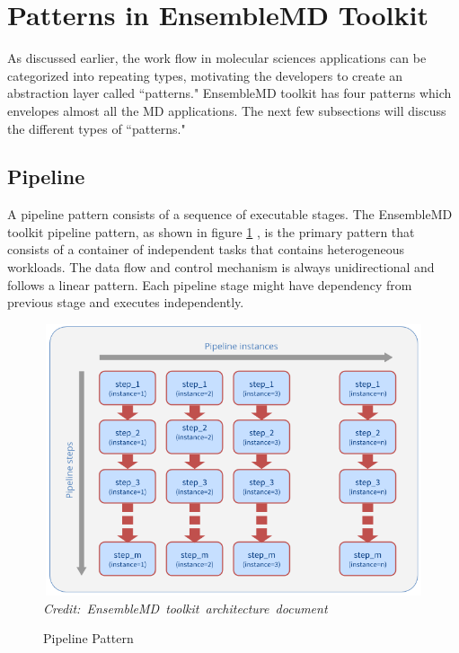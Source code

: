 \documentclass[10pt]{ruthesis}
\begin{document}

\section{Patterns in EnsembleMD Toolkit}
As discussed earlier, the work flow in molecular sciences applications can be categorized into repeating types, motivating the developers to create an abstraction layer called ``patterns." EnsembleMD toolkit has four patterns which envelopes almost all the MD applications. The next few subsections will discuss the different types of ``patterns."

\subsection{Pipeline}
A pipeline pattern consists of a sequence of executable stages. The EnsembleMD toolkit pipeline pattern, as shown in figure \ref{fig:pipeline} \cite{site1}, is the primary pattern that consists of a container of independent tasks that contains heterogeneous workloads. The data flow and control mechanism is always unidirectional and follows a linear pattern. Each pipeline stage might have dependency from previous stage and executes independently. 
\begin{figure}
  \centering
  \includegraphics[width=12cm,height=8cm]{pipeline_pattern.png}
  \hbox{\small\itshape Credit: EnsembleMD toolkit architecture document \cite{site1}}
  \caption{Pipeline Pattern}
  \label{fig:pipeline}
\end{figure}
\end{document}
